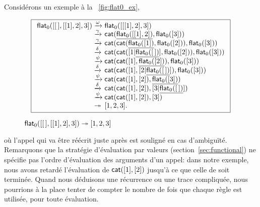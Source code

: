 Considérons un exemple à la \fig~\vref{fig:flat0_ex},
\begin{figure}[!b]
\begin{equation*}
\boxed{%
\begin{array}{r@{\;}l@{\;}l}
\fun{flat}_0([\el,[[1],2],3])
& \xrightarrow{\smash{\omega}}
& \fun{flat}_0([[[1],2],3])\\
& \xrightarrow{\smash{\gamma}}
& \fun{cat}(\underline{\fun{flat}_0([[1],2])},\fun{flat}_0([3]))\\
& \xrightarrow{\smash{\gamma}}
& \fun{cat}(\fun{cat}(\underline{\fun{flat}_0([1])},\fun{flat}_0([2])),\fun{flat}_0([3]))\\
& \xrightarrow{\smash{\delta}}
& \fun{cat}(\fun{cat}([1|\underline{\fun{flat}_0(\el)}],\fun{flat}_0([2])),\fun{flat}_0([3]))\\
& \xrightarrow{\smash{\psi}}
& \fun{cat}(\fun{cat}([1],\underline{\fun{flat}_0([2])}),\fun{flat}_0([3]))\\
& \xrightarrow{\smash{\delta}}
& \fun{cat}(\fun{cat}([1],[2|\underline{\fun{flat}_0(\el)}]),\fun{flat}_0([3]))\\
& \xrightarrow{\smash{\psi}}
& \fun{cat}(\fun{cat}([1],[2]),\underline{\fun{flat}_0([3])})\\
& \xrightarrow{\smash{\delta}}
& \fun{cat}(\fun{cat}([1],[2]),[3|\underline{\fun{flat}_0(\el)}])\\
& \xrightarrow{\smash{\psi}}
& \fun{cat}(\fun{cat}([1],[2]),[3])\\
& \twoheadrightarrow & [1,2,3].
\end{array}
}
\end{equation*}
\caption{\(\textsf{flat}_0([[\,],[[1],2],3]) \twoheadrightarrow [1,2,3]\)}
\label{fig:flat0_ex}
\end{figure}
où l'appel qui va être réécrit juste après est souligné en cas
d'ambiguïté. Remarquons que la stratégie d'évaluation par
valeurs
(section~\ref{sec:functional}) ne spécifie pas l'ordre d'évaluation
des arguments d'un appel: dans notre exemple, nous avons retardé
l'évaluation de \(\textsf{cat}([1],[2])\) 
jusqu'à ce que celle de
 soit terminée. Quand
nous déduisons une récurrence ou une trace compliquée, nous pourrions
à la place tenter de compter le nombre de fois que chaque règle est
utilisée, pour toute évaluation.

